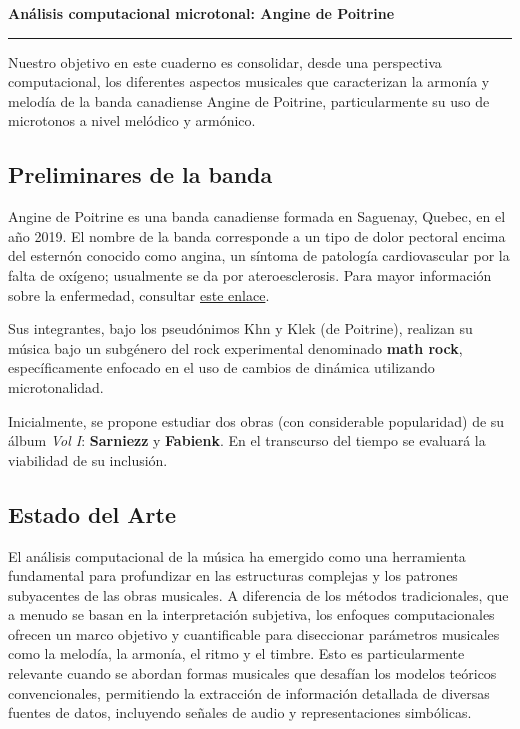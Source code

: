 \documentclass[11pt, a4paper]{article}
\begin{document}
{\color{accent}\LARGE\textbf{Análisis computacional microtonal: Angine de Poitrine}}\par
\vspace{0.5em}
{\color{muted}\rule{\linewidth}{0.6pt}}\par
\vspace{0.5em}

Nuestro objetivo en este cuaderno es consolidar, desde una perspectiva computacional, los diferentes aspectos musicales que caracterizan la armonía y melodía de la banda canadiense Angine de Poitrine, particularmente su uso de microtonos a nivel melódico y armónico.

\subsection*{Preliminares de la banda}

Angine de Poitrine es una banda canadiense formada en Saguenay, Quebec, en el año 2019. El nombre de la banda corresponde a un tipo de dolor pectoral encima del esternón conocido como angina, un síntoma de patología cardiovascular por la falta de oxígeno; usualmente se da por ateroesclerosis. Para mayor información sobre la enfermedad, consultar \href{https://www.ameli.fr/assure/sante/themes/angine-de-poitrine-angor/definition-causes-frequence-angine-poitrine}{este enlace}.

Sus integrantes, bajo los pseudónimos Khn y Klek (de Poitrine), realizan su música bajo un subgénero del rock experimental denominado \textbf{math rock}, específicamente enfocado en el uso de cambios de dinámica utilizando microtonalidad.

Inicialmente, se propone estudiar dos obras (con considerable popularidad) de su álbum \textit{Vol I}: \textbf{Sarniezz} y \textbf{Fabienk}. En el transcurso del tiempo se evaluará la viabilidad de su inclusión.

\subsection*{Estado del Arte}

El análisis computacional de la música ha emergido como una herramienta fundamental para profundizar en las estructuras complejas y los patrones subyacentes de las obras musicales. A diferencia de los métodos tradicionales, que a menudo se basan en la interpretación subjetiva, los enfoques computacionales ofrecen un marco objetivo y cuantificable para diseccionar parámetros musicales como la melodía, la armonía, el ritmo y el timbre. Esto es particularmente relevante cuando se abordan formas musicales que desafían los modelos teóricos convencionales, permitiendo la extracción de información detallada de diversas fuentes de datos, incluyendo señales de audio y representaciones simbólicas.
\end{document}
